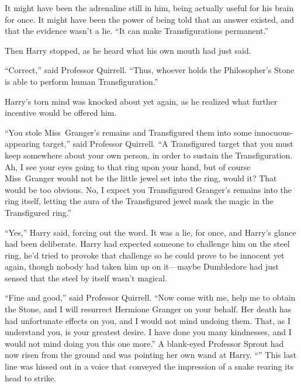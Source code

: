 It might have been the adrenaline still in him, being actually useful for his brain for once. It might have been the power of being told that an answer existed, and that the evidence wasn’t a lie. “It can make Transfigurations permanent.”

Then Harry stopped, as he heard what his own mouth had just said.

“Correct,” said Professor Quirrell. “Thus, whoever holds the Philosopher’s Stone is able to perform human Transfiguration.”

Harry’s torn mind was knocked about yet again, as he realized what further incentive would be offered him.

“You stole Miss~Granger’s remains and Transfigured them into some innocuous-appearing target,” said Professor Quirrell. “A Transfigured target that you must keep somewhere about your own person, in order to sustain the Transfiguration. Ah, I see your eyes going to that ring upon your hand, but of course Miss~Granger would not be the little jewel set into the ring, would it? That would be too obvious. No, I expect you Transfigured Granger’s remains into the ring itself, letting the aura of the Transfigured jewel mask the magic in the Transfigured ring.”

“Yes,” Harry said, forcing out the word. It was a lie, for once, and Harry’s glance had been deliberate. Harry had expected someone to challenge him on the steel ring, he’d tried to provoke that challenge so he could prove to be innocent yet again, though nobody had taken him up on it—maybe Dumbledore had just sensed that the steel by itself wasn’t magical.

“Fine and good,” said Professor Quirrell. “Now come with me, help me to obtain the Stone, and I will resurrect Hermione Granger on your behalf. Her death has had unfortunate effects on you, and I would not mind undoing them. That, as I understand you, is your greatest desire. I have done you many kindnesses, and I would not mind doing you this one more.” A blank-eyed Professor Sprout had now risen from the ground and was pointing her own wand at Harry. “” This last line was hissed out in a voice that conveyed the impression of a snake rearing its head to strike.

\later

